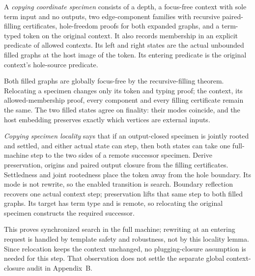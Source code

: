 
A \emph{copying coordinate specimen} consists of a depth, a focus-free context
with sole term input and no outputs, two edge-component families with recursive
paired-filling certificates, hole-freedom proofs for both expanded graphs,
and a term-typed token on the original context. It also records membership
in an explicit predicate of allowed contexts. Its left and right states
are the actual unbounded filled graphs at the host image of the token.
Its entering predicate is the original context's hole-source predicate.





Both filled graphs are globally focus-free by the recursive-filling
theorem. Relocating a specimen changes only its token and typing proof;
the context, its allowed-membership proof, every component and every
filling certificate remain the same. The two filled states agree on finality:
their modes coincide, and the host embedding preserves exactly which
vertices are external inputs.




\emph{Copying specimen locality} says that if an output-closed specimen is
jointly rooted and settled, and either actual state can step, then both
states can take one full-machine step to the two sides of a remote successor
specimen. Derive preservation, origins and paired output closure from the
filling certificates. Settledness and joint rootedness place the token away
from the hole boundary. Its mode is not rewrite, so the enabled transition
is search. Boundary reflection recovers one actual context step; preservation
lifts that same step to both filled graphs. Its target has term type and is
remote, so relocating the original specimen constructs the required successor.

This proves synchronized search in the full machine; rewriting at an entering
request is handled by template safety and robustness, not by this locality
lemma. Since relocation keeps the context unchanged, no plugging-closure
assumption is needed for this step. That observation does not settle the
separate global context-closure audit in Appendix~B.

